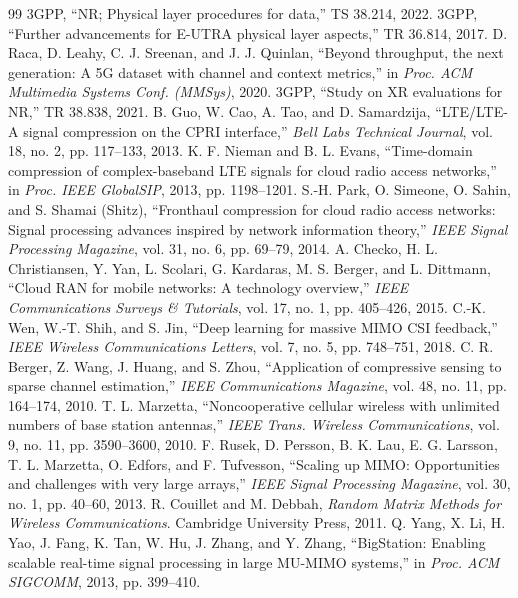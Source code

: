 \begin{thebibliography}{99}
 3GPP, ``NR; Physical layer procedures for data,'' TS 38.214, 2022.
 3GPP, ``Further advancements for E-UTRA physical layer aspects,'' TR 36.814, 2017.
 D. Raca, D. Leahy, C. J. Sreenan, and J. J. Quinlan, ``Beyond throughput, the next generation: A 5G dataset with channel and context metrics,'' in \emph{Proc. ACM Multimedia Systems Conf. (MMSys)}, 2020.
 3GPP, ``Study on XR evaluations for NR,'' TR 38.838, 2021.
 B. Guo, W. Cao, A. Tao, and D. Samardzija, ``LTE/LTE-A signal compression on the CPRI interface,'' \emph{Bell Labs Technical Journal}, vol. 18, no. 2, pp. 117--133, 2013.
 K. F. Nieman and B. L. Evans, ``Time-domain compression of complex-baseband LTE signals for cloud radio access networks,'' in \emph{Proc. IEEE GlobalSIP}, 2013, pp. 1198--1201.
 S.-H. Park, O. Simeone, O. Sahin, and S. Shamai (Shitz), ``Fronthaul compression for cloud radio access networks: Signal processing advances inspired by network information theory,'' \emph{IEEE Signal Processing Magazine}, vol. 31, no. 6, pp. 69--79, 2014.
 A. Checko, H. L. Christiansen, Y. Yan, L. Scolari, G. Kardaras, M. S. Berger, and L. Dittmann, ``Cloud RAN for mobile networks: A technology overview,'' \emph{IEEE Communications Surveys \& Tutorials}, vol. 17, no. 1, pp. 405--426, 2015.
 C.-K. Wen, W.-T. Shih, and S. Jin, ``Deep learning for massive MIMO CSI feedback,'' \emph{IEEE Wireless Communications Letters}, vol. 7, no. 5, pp. 748--751, 2018.
 C. R. Berger, Z. Wang, J. Huang, and S. Zhou, ``Application of compressive sensing to sparse channel estimation,'' \emph{IEEE Communications Magazine}, vol. 48, no. 11, pp. 164--174, 2010.
 T. L. Marzetta, ``Noncooperative cellular wireless with unlimited numbers of base station antennas,'' \emph{IEEE Trans. Wireless Communications}, vol. 9, no. 11, pp. 3590--3600, 2010.
 F. Rusek, D. Persson, B. K. Lau, E. G. Larsson, T. L. Marzetta, O. Edfors, and F. Tufvesson, ``Scaling up MIMO: Opportunities and challenges with very large arrays,'' \emph{IEEE Signal Processing Magazine}, vol. 30, no. 1, pp. 40--60, 2013.
 R. Couillet and M. Debbah, \emph{Random Matrix Methods for Wireless Communications}. Cambridge University Press, 2011.
 Q. Yang, X. Li, H. Yao, J. Fang, K. Tan, W. Hu, J. Zhang, and Y. Zhang, ``BigStation: Enabling scalable real-time signal processing in large MU-MIMO systems,'' in \emph{Proc. ACM SIGCOMM}, 2013, pp. 399--410.

\end{thebibliography}
